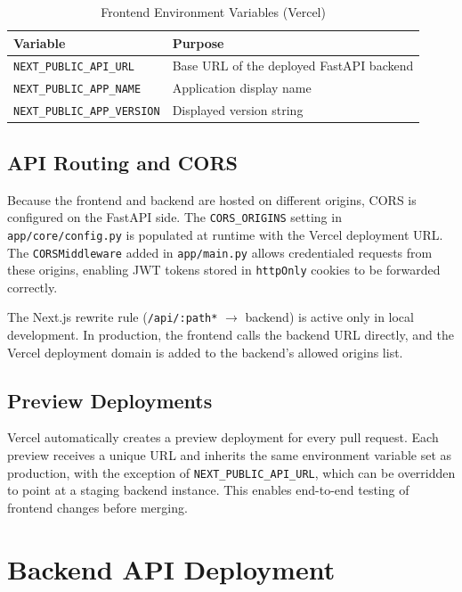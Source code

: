 \begin{table}[H]
\centering
\begin{tabular}{|p{5.5cm}|p{8cm}|}
\hline
\textbf{Variable} & \textbf{Purpose} \\
\hline
\texttt{NEXT\_PUBLIC\_API\_URL} & Base URL of the deployed FastAPI backend \\
\hline
\texttt{NEXT\_PUBLIC\_APP\_NAME} & Application display name \\
\hline
\texttt{NEXT\_PUBLIC\_APP\_VERSION} & Displayed version string \\
\hline
\end{tabular}
\caption{Frontend Environment Variables (Vercel)}
\label{tab:frontend-env}
\end{table}

\subsection{API Routing and CORS}

Because the frontend and backend are hosted on different origins, CORS is configured on the FastAPI side. The \texttt{CORS\_ORIGINS} setting in \texttt{app/core/config.py} is populated at runtime with the Vercel deployment URL. The \texttt{CORSMiddleware} added in \texttt{app/main.py} allows credentialed requests from these origins, enabling JWT tokens stored in \texttt{httpOnly} cookies to be forwarded correctly.

The Next.js rewrite rule (\texttt{/api/:path*} $\rightarrow$ backend) is active only in local development. In production, the frontend calls the backend URL directly, and the Vercel deployment domain is added to the backend's allowed origins list.

\subsection{Preview Deployments}

Vercel automatically creates a preview deployment for every pull request. Each preview receives a unique URL and inherits the same environment variable set as production, with the exception of \texttt{NEXT\_PUBLIC\_API\_URL}, which can be overridden to point at a staging backend instance. This enables end-to-end testing of frontend changes before merging.

\section{Backend API Deployment}
\label{sec:backend-deployment}


